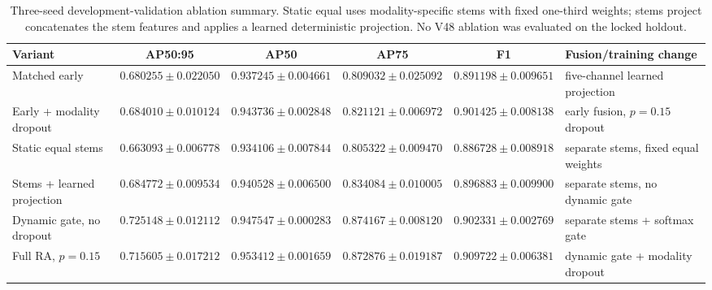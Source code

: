 \begin{table}[t]
\caption{Three-seed development-validation ablation summary. Static equal uses modality-specific stems with fixed one-third weights; stems project concatenates the stem features and applies a learned deterministic projection. No V48 ablation was evaluated on the locked holdout.}
\label{tab:v49-three-seed-causal-ablation}
\centering
\scriptsize
\begin{tabular}{lccccl}
\toprule
Variant & AP50:95 & AP50 & AP75 & F1 & Fusion/training change \\
\midrule
Matched early & $0.680255 \pm 0.022050$ & $0.937245 \pm 0.004661$ & $0.809032 \pm 0.025092$ & $0.891198 \pm 0.009651$ & five-channel learned projection \\
Early + modality dropout & $0.684010 \pm 0.010124$ & $0.943736 \pm 0.002848$ & $0.821121 \pm 0.006972$ & $0.901425 \pm 0.008138$ & early fusion, $p=0.15$ dropout \\
Static equal stems & $0.663093 \pm 0.006778$ & $0.934106 \pm 0.007844$ & $0.805322 \pm 0.009470$ & $0.886728 \pm 0.008918$ & separate stems, fixed equal weights \\
Stems + learned projection & $0.684772 \pm 0.009534$ & $0.940528 \pm 0.006500$ & $0.834084 \pm 0.010005$ & $0.896883 \pm 0.009900$ & separate stems, no dynamic gate \\
Dynamic gate, no dropout & $0.725148 \pm 0.012112$ & $0.947547 \pm 0.000283$ & $0.874167 \pm 0.008120$ & $0.902331 \pm 0.002769$ & separate stems + softmax gate \\
Full RA, $p=0.15$ & $0.715605 \pm 0.017212$ & $0.953412 \pm 0.001659$ & $0.872876 \pm 0.019187$ & $0.909722 \pm 0.006381$ & dynamic gate + modality dropout \\
\bottomrule
\end{tabular}
\end{table}
